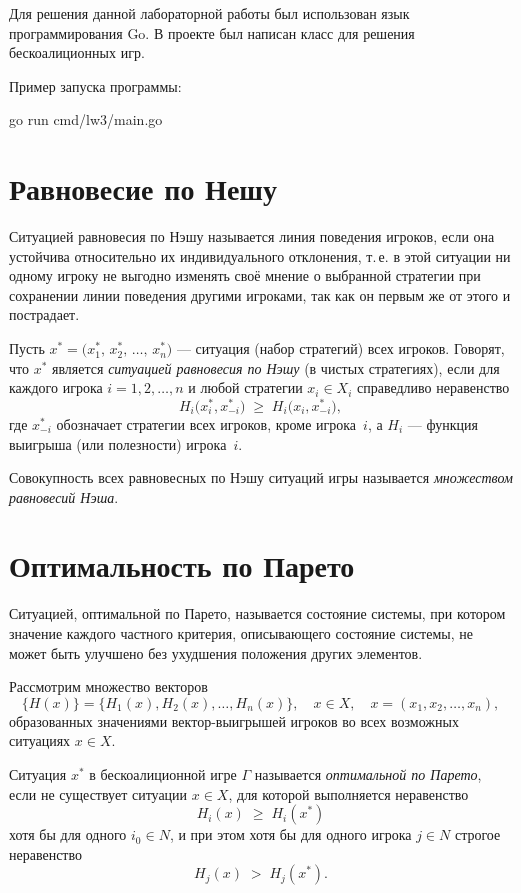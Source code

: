 
Для решения данной лабораторной работы был использован язык программирования Go.
В проекте был написан класс для решения бескоалиционных игр.

Пример запуска программы:

\begin{codelisting}[language=Bash]
    go run cmd/lw3/main.go
\end{codelisting}

\section*{Равновесие по Нешу}

Ситуацией равновесия по Нэшу называется линия поведения игроков, если она 
устойчива относительно их индивидуального отклонения, т.\,е. в этой 
ситуации ни одному игроку не выгодно изменять своё мнение о выбранной 
стратегии при сохранении линии поведения другими игроками, так как он 
первым же от этого и пострадает.

Пусть $x^* = \bigl(x_1^*,\, x_2^*,\, \dots,\, x_n^*\bigr)$ --- 
ситуация (набор стратегий) всех игроков. Говорят, что $x^*$ является 
\emph{ситуацией равновесия по Нэшу} (в чистых стратегиях), если 
для каждого игрока $i = 1,2,\dots,n$ и любой стратегии $x_i \in X_i$ 
справедливо неравенство
\[
    H_i\bigl(x_i^*, x_{-i}^*\bigr) \; \ge \;
    H_i\bigl(x_i, x_{-i}^*\bigr),
\]
где $x_{-i}^*$ обозначает стратегии всех игроков, кроме игрока~$i$, 
а $H_i$ --- функция выигрыша (или полезности) игрока~$i$.

Совокупность всех равновесных по Нэшу ситуаций игры называется 
\emph{множеством равновесий Нэша}.

\section*{Оптимальность по Парето}

Ситуацией, оптимальной по Парето, называется состояние системы, 
при котором значение каждого частного критерия, описывающего 
состояние системы, не может быть улучшено без ухудшения положения 
других элементов. 

Рассмотрим множество векторов 
\[
  \{H(x)\} = \{H_1(x), H_2(x), \dots, H_n(x)\}, 
  \quad x \in X, 
  \quad x = (x_1, x_2, \dots, x_n),
\]
образованных значениями вектор-выигрышей игроков во всех возможных 
ситуациях $x \in X$. 

Ситуация $x^*$ в бескоалиционной игре $\Gamma$ называется 
\emph{оптимальной по Парето}, если не существует ситуации 
$x \in X$, для которой выполняется неравенство
\[
  H_i(x) \; \ge \; H_i(x^*)
\]
хотя бы для одного $i_0 \in N$, и при этом хотя бы для одного 
игрока $j \in N$ строгое неравенство 
\[
  H_j(x) \; > \; H_j(x^*).
\]
